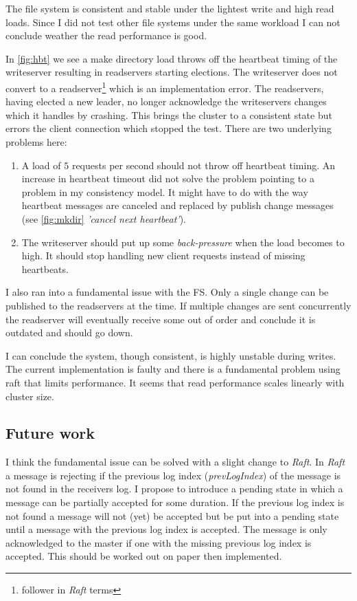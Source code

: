 The file system is consistent and stable under the lightest write and high read loads. Since I did not test other file systems under the same workload I can not conclude weather the read performance is good. 

In \cref{fig:hbt} we see a make directory load throws off the heartbeat timing of the writeserver resulting in readservers starting elections. The writeserver does not convert to a readserver\footnote{follower in \textit{Raft} terms} which is an implementation error. The readservers, having elected a new leader, no longer acknowledge the writeservers changes which it handles by crashing. This brings the cluster to a consistent state but errors the client connection which stopped the test. 
There are two underlying problems here:

\begin{enumerate}
	\item A load of $5$ requests per second should not throw off heartbeat timing. An increase in heartbeat timeout did not solve the problem pointing to a problem in my consistency model. It might have to do with the way heartbeat messages are canceled and replaced by publish change messages (see \cref{fig:mkdir} \textit{'cancel next heartbeat'}).
	\item The writeserver should put up some \textit{back-pressure} when the load becomes to high. It should stop handling new client requests instead of missing heartbeats.
\end{enumerate}

I also ran into a fundamental issue with the FS. Only a single change can be published to the readservers at the time. If multiple changes are sent concurrently the readserver will eventually receive some out of order and conclude it is outdated and should go down. 

I can conclude the system, though consistent, is highly unstable during writes. The current implementation is faulty and there is a fundamental problem using raft that limits performance. It seems that read performance scales linearly with cluster size. 

\subsection{Future work}
I think the fundamental issue can be solved with a slight change to \textit{Raft}. In \textit{Raft} a message is rejecting if the previous log index (\textit{prevLogIndex}) of the message is not found in the receivers log. I propose to introduce a pending state in which a message can be partially accepted for some duration. If the previous log index is not found a message will not (yet) be accepted but be put into a pending state until a message with the previous log index is accepted. The message is only acknowledged to the master if one with the missing previous log index is accepted. This should be worked out on paper then implemented.

